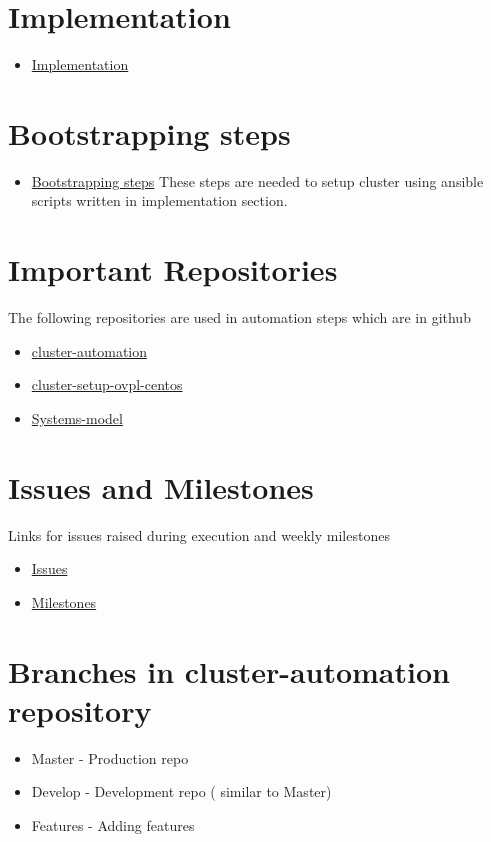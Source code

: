 \documentclass[11pt]{article}
\begin{document}
\section{Implementation}
\label{sec-5}

\begin{itemize}
\item \href{file://../imp/index.org}{Implementation}
\end{itemize}
\section{Bootstrapping steps}
\label{sec-6}

\begin{itemize}
\item \href{file:///home/sunandan/Desktop/internship/cluster-automation/src/bootstrapping.org}{Bootstrapping steps}
    These steps are needed to setup cluster using ansible scripts
    written in implementation section.
\end{itemize}
\section{Important Repositories}
\label{sec-7}

  The following repositories are used in automation steps which are in github
\begin{itemize}
\item \href{https://github.com/vlead/cluster-automation}{cluster-automation}
\item \href{https://github.com/vlead/cluster-setup-ovpl-centos}{cluster-setup-ovpl-centos}
\item \href{https://bitbucket.org/vlead/systems-model/}{Systems-model}
\end{itemize}
  
\section{Issues and Milestones}
\label{sec-8}

  Links for issues raised during execution and weekly milestones
\begin{itemize}
\item \href{https://github.com/vlead/cluster-automation/issues}{Issues}
\item \href{https://github.com/vlead/cluster-automation/milestones}{Milestones}
\end{itemize}
\section{Branches in cluster-automation repository}
\label{sec-9}

\begin{itemize}
\item Master   - Production repo
\item Develop  - Development repo ( similar to Master)
\item Features - Adding features
\end{itemize}
\end{document}
